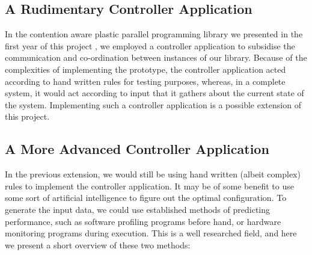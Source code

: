 \subsection{A Rudimentary Controller Application}
\label{section:conclusion_and_future_work:a_rudimentary_controller_application}

In the contention aware plastic parallel programming library we presented in the first year of this project \cite{me}, we employed a controller application to subsidise the communication and co-ordination between instances of our library. Because of the complexities of implementing the prototype, the controller application acted according to hand written rules for testing purposes, whereas, in a complete system, it would act according to input that it gathers about the current state of the system. Implementing such a controller application is a possible extension of this project.



\subsection{A More Advanced Controller Application}
\label{section:conclusion_and_future_work:a_more_advanced_controller_application}

In the previous extension, we would still be using hand written (albeit complex) rules to implement the controller application. It may be of some benefit to use some sort of artificial intelligence to figure out the optimal configuration. To generate the input data, we could use established methods of predicting performance, such as software profiling programs before hand, or hardware monitoring programs during execution. This is a well researched field, and here we present a short overview of these two methods:

